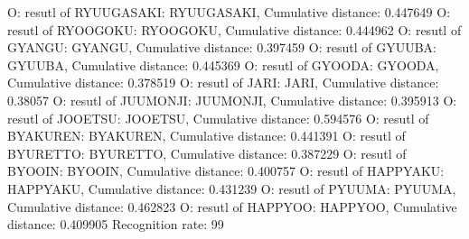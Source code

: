 O: resutl of RYUUGASAKI: RYUUGASAKI, Cumulative distance: 0.447649
O: resutl of RYOOGOKU: RYOOGOKU, Cumulative distance: 0.444962
O: resutl of GYANGU: GYANGU, Cumulative distance: 0.397459
O: resutl of GYUUBA: GYUUBA, Cumulative distance: 0.445369
O: resutl of GYOODA: GYOODA, Cumulative distance: 0.378519
O: resutl of JARI: JARI, Cumulative distance: 0.38057
O: resutl of JUUMONJI: JUUMONJI, Cumulative distance: 0.395913
O: resutl of JOOETSU: JOOETSU, Cumulative distance: 0.594576
O: resutl of BYAKUREN: BYAKUREN, Cumulative distance: 0.441391
O: resutl of BYURETTO: BYURETTO, Cumulative distance: 0.387229
O: resutl of BYOOIN: BYOOIN, Cumulative distance: 0.400757
O: resutl of HAPPYAKU: HAPPYAKU, Cumulative distance: 0.431239
O: resutl of PYUUMA: PYUUMA, Cumulative distance: 0.462823
O: resutl of HAPPYOO: HAPPYOO, Cumulative distance: 0.409905
Recognition rate: 99%
